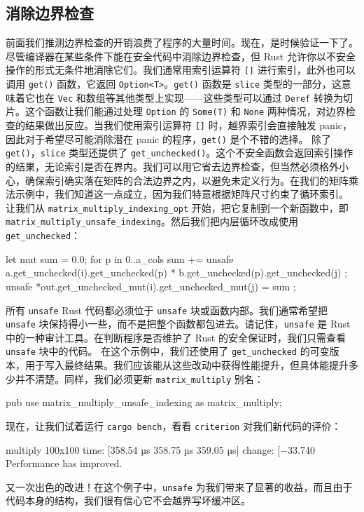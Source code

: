 \subsection{消除边界检查}
\label{idx:idx_52bc3eed}
前面我们推测边界检查的开销浪费了程序的大量时间。现在，是时候验证一下了。尽管编译器在某些条件下能在安全代码中消除边界检查，但 Rust 允许你以不安全操作的形式无条件地消除它们。我们通常用索引运算符 \texttt{[]} 进行索引，此外也可以调用 \texttt{get()} 函数，它返回 \texttt{Option<T>}。\texttt{get()} 函数是 \texttt{slice} 类型的一部分，这意味着它也在 \texttt{Vec} 和数组等其他类型上实现——这些类型可以通过 \texttt{Deref} 转换为切片。这个函数让我们能通过处理 \texttt{Option} 的 \texttt{Some(T)} 和 \texttt{None} 两种情况，对边界检查的结果做出反应。当我们使用索引运算符 \texttt{[]} 时，越界索引会直接触发 panic，因此对于希望尽可能消除潜在 panic 的程序，\texttt{get()} 是个不错的选择。
除了 \texttt{get()}，\texttt{slice} 类型还提供了 \texttt{get\_\allowbreak{}unchecked(\allowbreak{})\allowbreak{}}。这个不安全函数会返回索引操作的结果，无论索引是否在界内。我们可以用它省去边界检查，但当然必须格外小心，确保索引确实落在矩阵的合法边界之内，以避免未定义行为。在我们的矩阵乘法示例中，我们知道这一点成立，因为我们特意根据矩阵尺寸约束了循环索引。
让我们从 \texttt{matrix\_\allowbreak{}multiply\_\allowbreak{}indexing\_\allowbreak{}opt} 开始，把它复制到一个新函数中，即
\texttt{matrix\_\allowbreak{}multiply\_\allowbreak{}unsafe\_\allowbreak{}indexing}。然后我们把内层循环改成使用 \texttt{get\_\allowbreak{}unchecked}：
\begin{codebox}[rust]
let mut sum = 0.0;
for p in 0..a_cols {
    sum += unsafe {
        a.get_unchecked(i).get_unchecked(p) *
        b.get_unchecked(p).get_unchecked(j)
    };
}
unsafe { *out.get_unchecked_mut(i).get_unchecked_mut(j) = sum };
\end{codebox}
所有 \texttt{unsafe} Rust 代码都必须位于 \texttt{unsafe} 块或函数内部。我们通常希望把 \texttt{unsafe} 块保持得小一些，而不是把整个函数都包进去。请记住，\texttt{unsafe} 是 Rust 中的一种审计工具。在判断程序是否维护了 Rust 的安全保证时，我们只需查看 \texttt{unsafe} 块中的代码。
在这个示例中，我们还使用了 \texttt{get\_\allowbreak{}unchecked} 的可变版本，用于写入最终结果。我们应该能从这些改动中获得性能提升，但具体能提升多少并不清楚。同样，我们必须更新 \texttt{matrix\_\allowbreak{}multiply} 别名：
\begin{codebox}[rust]
pub use matrix_multiply_unsafe_indexing as matrix_multiply;
\end{codebox}
现在，让我们试着运行 \texttt{cargo bench}，看看 \texttt{criterion} 对我们新代码的评价：
\begin{codeboxdark}
multiply 100x100         time:   [358.54 µs 358.75 µs 359.05 µs]
                         change: [−33.740%
                         Performance has improved.
\end{codeboxdark}
\label{idx:idx_c91bf658}
又一次出色的改进！在这个例子中，\texttt{unsafe} 为我们带来了显著的收益，而且由于代码本身的结构，我们很有信心它不会越界写坏缓冲区。
